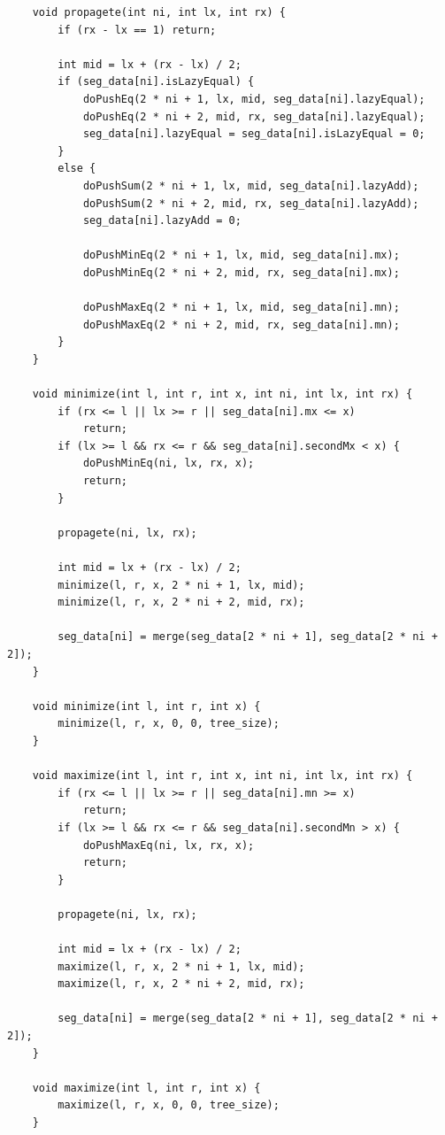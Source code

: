 \documentclass[9pt,a4paper,twocolumn]{extarticle}
\begin{document}
\begin{lstlisting}
    void propagete(int ni, int lx, int rx) {
        if (rx - lx == 1) return;

        int mid = lx + (rx - lx) / 2;
        if (seg_data[ni].isLazyEqual) {
            doPushEq(2 * ni + 1, lx, mid, seg_data[ni].lazyEqual);
            doPushEq(2 * ni + 2, mid, rx, seg_data[ni].lazyEqual);
            seg_data[ni].lazyEqual = seg_data[ni].isLazyEqual = 0;
        }
        else {
            doPushSum(2 * ni + 1, lx, mid, seg_data[ni].lazyAdd);
            doPushSum(2 * ni + 2, mid, rx, seg_data[ni].lazyAdd);
            seg_data[ni].lazyAdd = 0;

            doPushMinEq(2 * ni + 1, lx, mid, seg_data[ni].mx);
            doPushMinEq(2 * ni + 2, mid, rx, seg_data[ni].mx);

            doPushMaxEq(2 * ni + 1, lx, mid, seg_data[ni].mn);
            doPushMaxEq(2 * ni + 2, mid, rx, seg_data[ni].mn);
        }
    }

    void minimize(int l, int r, int x, int ni, int lx, int rx) {
        if (rx <= l || lx >= r || seg_data[ni].mx <= x)
            return;
        if (lx >= l && rx <= r && seg_data[ni].secondMx < x) {
            doPushMinEq(ni, lx, rx, x);
            return;
        }

        propagete(ni, lx, rx);

        int mid = lx + (rx - lx) / 2;
        minimize(l, r, x, 2 * ni + 1, lx, mid);
        minimize(l, r, x, 2 * ni + 2, mid, rx);

        seg_data[ni] = merge(seg_data[2 * ni + 1], seg_data[2 * ni + 2]);
    }

    void minimize(int l, int r, int x) {
        minimize(l, r, x, 0, 0, tree_size);
    }

    void maximize(int l, int r, int x, int ni, int lx, int rx) {
        if (rx <= l || lx >= r || seg_data[ni].mn >= x)
            return;
        if (lx >= l && rx <= r && seg_data[ni].secondMn > x) {
            doPushMaxEq(ni, lx, rx, x);
            return;
        }

        propagete(ni, lx, rx);

        int mid = lx + (rx - lx) / 2;
        maximize(l, r, x, 2 * ni + 1, lx, mid);
        maximize(l, r, x, 2 * ni + 2, mid, rx);

        seg_data[ni] = merge(seg_data[2 * ni + 1], seg_data[2 * ni + 2]);
    }

    void maximize(int l, int r, int x) {
        maximize(l, r, x, 0, 0, tree_size);
    }


\end{lstlisting}
\end{document}
